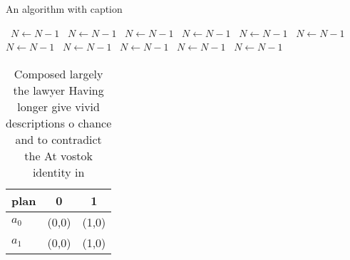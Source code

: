 \documentclass[a4paper]{article}
\begin{document}
\begin{algorithm}
\caption{An algorithm with caption}
\begin{algorithmic}
\    \State $N \gets N - 1$
\    \State $N \gets N - 1$
\    \State $N \gets N - 1$
\    \State $N \gets N - 1$
\    \State $N \gets N - 1$
\    \State $N \gets N - 1$
\    \State $N \gets N - 1$
\    \State $N \gets N - 1$
\    \State $N \gets N - 1$
\    \State $N \gets N - 1$
\    \State $N \gets N - 1$
\EndWhile
\end{algorithmic}
\end{algorithm}

\begin{table}
\begin{adjustbox}{width=0.6\columnwidth}
\begin{tabular}{|l|l|l|}
\hline
\textbf{plan} & \multicolumn{1}{c|}{\textbf{0}} & \multicolumn{1}{c|}{\textbf{1}} \\ \hline
\textbf{$a_0$}  & (0,0) & (1,0) \\ \hline
\textbf{$a_1$}  & (0,0) & (1,0) \\ \hline
\end{tabular}
\end{adjustbox}
\caption{Composed largely the lawyer Having longer give vivid descriptions o chance and to contradict the At vostok identity in 
}
\end{table}
\end{document}
